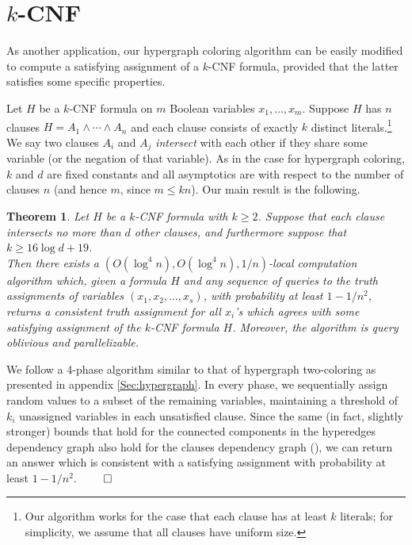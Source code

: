 \documentclass[english, oribibl]{llncs}
\newtheorem{theorem}{Theorem}[section]
\newenvironment{sketch}{\noindent{\bf Proof [Sketch]:~~}}{\(\qed\)}
\begin{document}
\section{\texorpdfstring{$k$-CNF}
{k-CNF}}\label{kcnf}

As another application, our hypergraph coloring algorithm can be easily modified to 
compute a satisfying assignment of a $k$-CNF formula, 
provided that the latter satisfies some specific properties.

Let $H$ be a $k$-CNF formula on $m$ Boolean variables $x_{1}, \ldots, x_{m}$.
Suppose $H$ has $n$ clauses $H=A_{1} \wedge \cdots \wedge A_{n}$
and each clause consists of exactly $k$ distinct literals.\footnote{
Our algorithm works for the case that each clause has at least $k$ literals; 
for simplicity, we assume that all clauses have uniform size.}
We say two clauses $A_{i}$ and $A_{j}$ \emph{intersect} 
with each other if they
share some variable (or the negation of that variable).
As in the case for hypergraph coloring, $k$ and $d$ are fixed constants
and all asymptotics are with respect to the number of clauses $n$ (and hence $m$, since $m\leq kn$).
Our main result is the following.

\begin{theorem}
Let $H$ be a $k$-CNF formula with $k\geq 2$. 
Suppose that each clause intersects no more than $d$ other clauses,
and furthermore suppose that $k \geq 16 \log{d} + 19$.\\
Then there exists a $(O(\log^4{n}), O(\log^4{n}), 1/n)$-local computation algorithm which, given a formula $H$ and any sequence of
queries to the truth assignments of variables $(x_1, x_2, \ldots, x_s)$, 
with probability at least $1-1/n^2$,
returns a consistent truth assignment for all $x_i$'s which agrees with some 
satisfying assignment of the $k$-CNF formula $H$. 
Moreover, the algorithm is query oblivious and parallelizable. 
\end{theorem}



\begin{sketch}
We follow a 4-phase algorithm similar to that of 
hypergraph two-coloring as presented in appendix \ref{Sec:hypergraph}.
In every phase, we sequentially assign random values to a subset of the remaining variables,
maintaining a threshold of $k_i$ unassigned variables in each unsatisfied clause.
Since the same (in fact, slightly stronger) bounds that hold for the connected components
in the hyperedges dependency graph also hold for the clauses dependency graph (\cite{RTVX11b}),
we can return an answer which is consistent with a satisfying assignment with probability at least $1-1/n^2$.
\end{sketch}
\end{document}
